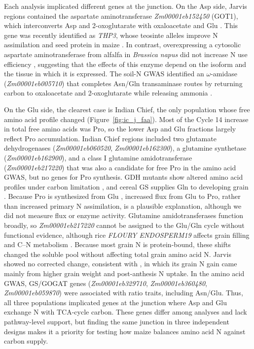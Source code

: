 \documentclass[namedate,unnumsec,webpdf,contemporary,large]{oup-authoring-template}
\begin{document}
Each analysis implicated different genes at the junction. On the Asp side, Jarvis regions contained the aspartate aminotransferase \textit{Zm00001eb152450} (GOT1), which interconverts Asp and 2-oxoglutarate with oxaloacetate and Glu \citep{Han2021Aspartate, Zhou2009AspAT}. This gene was recently identified as \textit{THP3}, whose teosinte alleles improve N assimilation and seed protein in maize \citep{Huang2026THP3}. In contrast, overexpressing a cytosolic aspartate aminotransferase from alfalfa in \textit{Brassica napus} did not increase N use efficiency \citep{McAllister2016AAT}, suggesting that the effects of this enzyme depend on the isoform and the tissue in which it is expressed. The soil-N GWAS identified an $\omega$-amidase (\textit{Zm00001eb005710}) that completes Asn/Gln transaminase routes by returning carbon to oxaloacetate and 2-oxoglutarate while releasing ammonia \citep{Zhang2014OmegaAmidase}.

On the Glu side, the clearest case is Indian Chief, the only population whose free amino acid profile changed (Figure~\ref{fig:ic_j_faa}). Most of the Cycle 14 increase in total free amino acids was Pro, so the lower Asp and Glu fractions largely reflect Pro accumulation. Indian Chief regions included two glutamate dehydrogenases (\textit{Zm00001eb060520}, \textit{Zm00001eb162300}), a glutamine synthetase (\textit{Zm00001eb162900}), and a class I glutamine amidotransferase (\textit{Zm00001eb217220}) that was also a candidate for free Pro in the amino acid GWAS, but no genes for Pro synthesis. GDH mutants show altered amino acid profiles under carbon limitation \citep{Miyashita2008GDH, Dellero2020AminoNUE}, and cereal GS supplies Gln to developing grain \citep{Wei2021WheatGS, Fujita2022RiceGS13}. Because Pro is synthesized from Glu \citep{Lehmann2010ProMetab, Alvarez2022ProHub}, increased flux from Glu to Pro, rather than increased primary N assimilation, is a plausible explanation, although we did not measure flux or enzyme activity. Glutamine amidotransferases function broadly, so \textit{Zm00001eb217220} cannot be assigned to the Glu/Gln cycle without functional evidence, although rice \textit{FLOURY ENDOSPERM19} affects grain filling and C--N metabolism \citep{Lou2021FLO19}. Because most grain N is protein-bound, these shifts changed the soluble pool without affecting total grain amino acid N. Jarvis showed no corrected change, consistent with \citet{Moll1994}, in which its grain N gain came mainly from higher grain weight and post-anthesis N uptake. In the amino acid GWAS, GS/GOGAT genes (\textit{Zm00001eb329710}, \textit{Zm00001eb360480}, \textit{Zm00001eb059870}) were associated with ratio traits, including Asn/Glu. Thus, all three populations implicated genes at the junction where Asp and Glu exchange N with TCA-cycle carbon. These genes differ among analyses and lack pathway-level support, but finding the same junction in three independent designs makes it a priority for testing how maize balances amino acid N against carbon supply.
\end{document}

